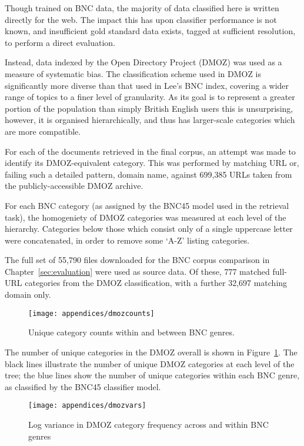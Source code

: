 
Though trained on BNC data, the majority of data classified here is written directly for the web.  The impact this has upon classifier performance is not known, and insufficient gold standard data exists, tagged at sufficient resolution, to perform a direct evaluation.

Instead, data indexed by the Open Directory Project (DMOZ) was used as a measure of systematic bias.  The classification scheme used in DMOZ is significantly more diverse than that used in Lee's BNC index, covering a wider range of topics to a finer level of granularity.  As its goal is to represent a greater portion of the population than simply British English users this is unsurprising, however, it is organised hierarchically, and thus has larger-scale categories which are more compatible.

For each of the documents retrieved in the final corpus, an attempt was made to identify its DMOZ-equivalent category.  This was performed by matching URL or, failing such a detailed pattern, domain name, against 699,385 URLs taken from the publicly-accessible DMOZ archive.

For each BNC category (as assigned by the BNC45 model used in the retrieval task), the homogeniety of DMOZ categories was measured at each level of the hierarchy.  Categories below those which consist only of a single uppercase letter were concatenated, in order to remove some `A-Z' listing categories.


The full set of 55,790 files downloaded for the BNC corpus comparison in Chapter~\ref{sec:evaluation} were used as source data.  Of these, 777 matched full-URL categories from the DMOZ classification, with a further 32,697 matching domain only.


\begin{figure}[h]
    \centering
    \texttt{[image: appendices/dmozcounts]}
    \caption{Unique category counts within and between BNC genres.}
    \label{fig:appendices:dmozcounts}
\end{figure}

The number of unique categories in the DMOZ overall is shown in Figure~\ref{fig:appendices:dmozcounts}.  The black lines illustrate the number of unique DMOZ categories at each level of the tree; the blue lines show the number of unique categories within each BNC genre, as classified by the BNC45 classifier model.


\begin{figure}[h]
    \centering
    \texttt{[image: appendices/dmozvars]}
    \caption{Log variance in DMOZ category frequency across and within BNC genres}
    \label{fig:appendices:dmozvars}
\end{figure}

